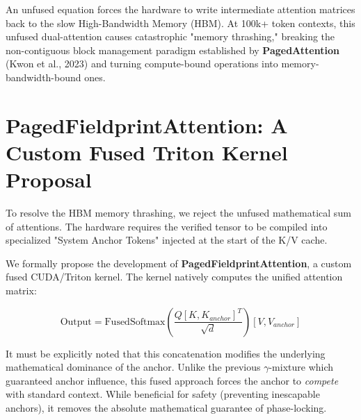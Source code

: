 \documentclass{article}
\begin{document}
An unfused equation forces the hardware to write intermediate attention matrices back to the slow High-Bandwidth Memory (HBM). At 100k+ token contexts, this unfused dual-attention causes catastrophic "memory thrashing," breaking the non-contiguous block management paradigm established by \textbf{PagedAttention} (Kwon et al., 2023) and turning compute-bound operations into memory-bandwidth-bound ones.

\section{PagedFieldprintAttention: A Custom Fused Triton Kernel Proposal}
To resolve the HBM memory thrashing, we reject the unfused mathematical sum of attentions. The hardware requires the verified tensor to be compiled into specialized "System Anchor Tokens" injected at the start of the K/V cache.

We formally propose the development of \textbf{PagedFieldprintAttention}, a custom fused CUDA/Triton kernel. The kernel natively computes the unified attention matrix:

\begin{equation}
\text{Output} = \text{FusedSoftmax}\left(\frac{Q [K, K_{anchor}]^T}{\sqrt{d}}\right) [V, V_{anchor}]
\end{equation}

It must be explicitly noted that this concatenation modifies the underlying mathematical dominance of the anchor. Unlike the previous $\gamma$-mixture which guaranteed anchor influence, this fused approach forces the anchor to \emph{compete} with standard context. While beneficial for safety (preventing inescapable anchors), it removes the absolute mathematical guarantee of phase-locking.
\end{document}
